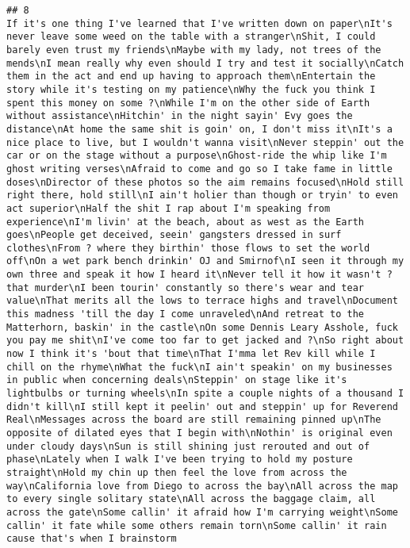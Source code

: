 \documentclass[]{article}
\begin{document}
\begin{verbatim}
## 8                                                                                                                                                                                                                                                                                                                                                                                          If it's one thing I've learned that I've written down on paper\nIt's never leave some weed on the table with a stranger\nShit, I could barely even trust my friends\nMaybe with my lady, not trees of the mends\nI mean really why even should I try and test it socially\nCatch them in the act and end up having to approach them\nEntertain the story while it's testing on my patience\nWhy the fuck you think I spent this money on some ?\nWhile I'm on the other side of Earth without assistance\nHitchin' in the night sayin' Evy goes the distance\nAt home the same shit is goin' on, I don't miss it\nIt's a nice place to live, but I wouldn't wanna visit\nNever steppin' out the car or on the stage without a purpose\nGhost-ride the whip like I'm ghost writing verses\nAfraid to come and go so I take fame in little doses\nDirector of these photos so the aim remains focused\nHold still right there, hold still\nI ain't holier than though or tryin' to even act superior\nHalf the shit I rap about I'm speaking from experience\nI'm livin' at the beach, about as west as the Earth goes\nPeople get deceived, seein' gangsters dressed in surf clothes\nFrom ? where they birthin' those flows to set the world off\nOn a wet park bench drinkin' OJ and Smirnof\nI seen it through my own three and speak it how I heard it\nNever tell it how it wasn't ? that murder\nI been tourin' constantly so there's wear and tear value\nThat merits all the lows to terrace highs and travel\nDocument this madness 'till the day I come unraveled\nAnd retreat to the Matterhorn, baskin' in the castle\nOn some Dennis Leary Asshole, fuck you pay me shit\nI've come too far to get jacked and ?\nSo right about now I think it's 'bout that time\nThat I'mma let Rev kill while I chill on the rhyme\nWhat the fuck\nI ain't speakin' on my businesses in public when concerning deals\nSteppin' on stage like it's lightbulbs or turning wheels\nIn spite a couple nights of a thousand I didn't kill\nI still kept it peelin' out and steppin' up for Reverend Real\nMessages across the board are still remaining pinned up\nThe opposite of dilated eyes that I begin with\nNothin' is original even under cloudy days\nSun is still shining just rerouted and out of phase\nLately when I walk I've been trying to hold my posture straight\nHold my chin up then feel the love from across the way\nCalifornia love from Diego to across the bay\nAll across the map to every single solitary state\nAll across the baggage claim, all across the gate\nSome callin' it afraid how I'm carrying weight\nSome callin' it fate while some others remain torn\nSome callin' it rain cause that's when I brainstorm

\end{verbatim}
\end{document}
